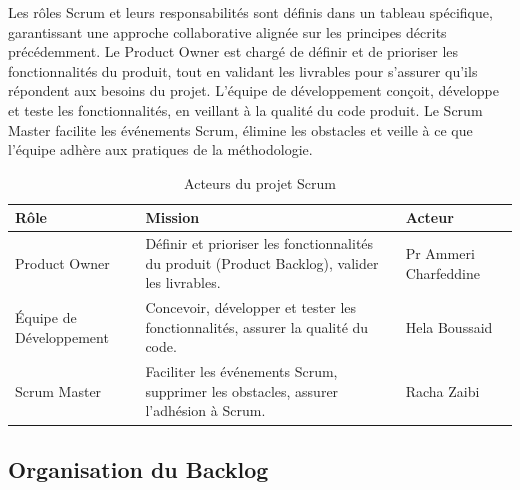 Les rôles Scrum et leurs responsabilités sont définis dans un tableau spécifique, garantissant une approche collaborative alignée sur les principes décrits précédemment. Le Product Owner est chargé de définir et de prioriser les fonctionnalités du produit, tout en validant les livrables pour s’assurer qu’ils répondent aux besoins du projet. L’équipe de développement conçoit, développe et teste les fonctionnalités, en veillant à la qualité du code produit. Le Scrum Master facilite les événements Scrum, élimine les obstacles et veille à ce que l’équipe adhère aux pratiques de la méthodologie.

\begin{table}[H]
\centering
\caption{Acteurs du projet Scrum}
\label{tab:roles_scrum}
\begin{tabular}{|p{3cm}|p{7cm}|p{3cm}|}
\hline
\textbf{Rôle} & \textbf{Mission} & \textbf{Acteur} \\
\hline
Product Owner & Définir et prioriser les fonctionnalités du produit (Product Backlog), valider les livrables. & Pr Ammeri Charfeddine \\
\hline
Équipe de Développement & Concevoir, développer et tester les fonctionnalités, assurer la qualité du code. & Hela Boussaid \\
\hline
Scrum Master & Faciliter les événements Scrum, supprimer les obstacles, assurer l'adhésion à Scrum. & Racha Zaibi \\
\hline
\end{tabular}
\end{table}

\subsection{Organisation du Backlog}
\label{subsec:backlog}

